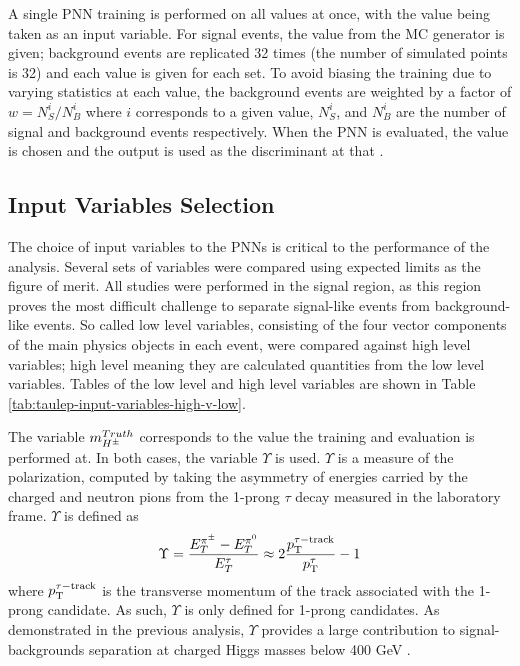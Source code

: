 			A single PNN training is performed on all \mHpm values at once, with the \mHpm value being taken as an input variable. For signal events, the \mHpm value from the MC generator is given; background events are replicated 32 times (the number of simulated \mHpm points is 32) and each \mHpm value is given for each set. To avoid biasing the training due to varying statistics at each \mHpm value, the background events are weighted by a factor of $w = N^{i}_{S}/N^{i}_{B}$ where $i$ corresponds to a given \mHpm value, $N^{i}_{S}$, and $N^{i}_{B}$ are the number of signal and background events respectively. When the PNN is evaluated, the \mHpm value is chosen and the output is used as the discriminant at that \mHpm.

		\subsection{Input Variables Selection}\label{ssec:input-variables}
			The choice of input variables to the PNNs is critical to the performance of the analysis. Several sets of variables were compared using expected limits as the figure of merit. All studies were performed in the \taulep signal region, as this region proves the most difficult challenge to separate signal-like events from background-like events. So called low level variables, consisting of the four vector components of the main physics objects in each event, were compared against high level variables; high level meaning they are calculated quantities from the low level variables. Tables of the low level and high level variables are shown in Table \ref{tab:taulep-input-variables-high-v-low}. 

			The variable $m_{H^{\pm}}^{Truth}$ corresponds to the \mHpm value the training and evaluation is performed at. In both cases, the variable $\Upsilon$ is used. $\Upsilon$ is a measure of the \tauhad polarization, computed by taking the asymmetry of energies carried by the charged and neutron pions from the 1-prong $\tau$ decay measured in the laboratory frame. $\Upsilon$ is defined as
			\begin{equation}\label{eqn:upsilon}
			\Upsilon = \frac{ E^{\pi^{\pm}}_{T} - E^{\pi^{0}}_{T}}{E^{\tau}_{T}} \approx 2 \frac{p_{\text{T}}^{\tau-\mathrm{track}}}{p_{\text{T}}^{\tau}} -1
			\end{equation}
			where $p_{\text{T}}^{\tau-\mathrm{track}}$ is the transverse momentum of the track associated with the 1-prong \tauhad candidate. As such, $\Upsilon$ is only defined for 1-prong \tauhad candidates. As demonstrated in the previous analysis, $\Upsilon$ provides a large contribution to signal-backgrounds separation at charged Higgs masses below 400 GeV \cite{hpm-previous}.


